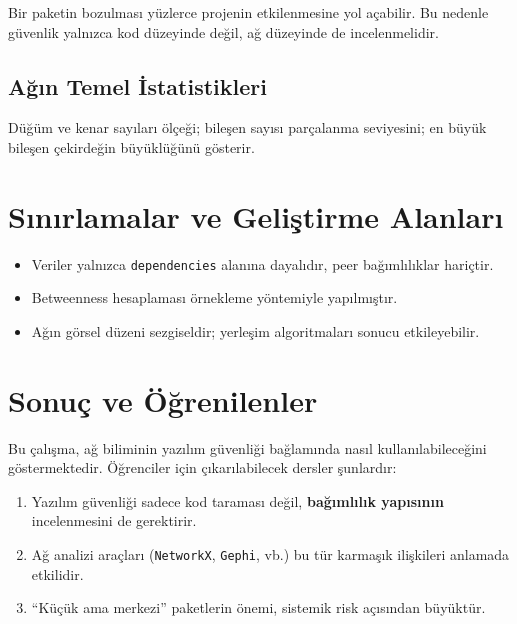 \documentclass[11pt,a4paper]{article}
\begin{document}
\begin{tipbox}
Bir paketin bozulması yüzlerce projenin etkilenmesine yol açabilir. Bu nedenle güvenlik yalnızca kod düzeyinde değil, ağ düzeyinde de incelenmelidir.
\end{tipbox}


\subsection{Ağın Temel İstatistikleri}
\begin{tipbox}
Düğüm ve kenar sayıları ölçeği; bileşen sayısı parçalanma seviyesini; en büyük bileşen çekirdeğin büyüklüğünü gösterir.
\end{tipbox}
\section{Sınırlamalar ve Geliştirme Alanları}
\begin{itemize}
  \item Veriler yalnızca \texttt{dependencies} alanına dayalıdır, peer bağımlılıklar hariçtir.
  \item Betweenness hesaplaması örnekleme yöntemiyle yapılmıştır.
  \item Ağın görsel düzeni sezgiseldir; yerleşim algoritmaları sonucu etkileyebilir.
\end{itemize}

\section{Sonuç ve Öğrenilenler}
Bu çalışma, ağ biliminin yazılım güvenliği bağlamında nasıl kullanılabileceğini göstermektedir. 
Öğrenciler için çıkarılabilecek dersler şunlardır:

\begin{enumerate}
  \item Yazılım güvenliği sadece kod taraması değil, \textbf{bağımlılık yapısının} incelenmesini de gerektirir.
  \item Ağ analizi araçları (\texttt{NetworkX}, \texttt{Gephi}, vb.) bu tür karmaşık ilişkileri anlamada etkilidir.
  \item “Küçük ama merkezi” paketlerin önemi, sistemik risk açısından büyüktür.
\end{enumerate}

\appendix
\end{document}
